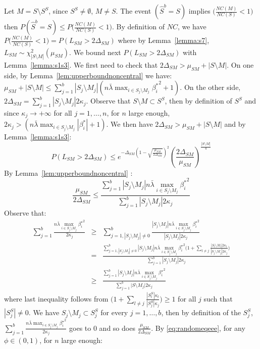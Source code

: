 \documentclass[aos]{imsart}
\theoremstyle{plain}
\begin{document}
\begin{supplement}
Let $M=S\setminus S^S$, since $S^S\neq \emptyset$, $M\neq S$. The event $(\hat{S}^b=S)$ implies $\big(\frac{NC(M)}{NC(S)}<1\big)$ then $P(\hat{S}^b=S)\leq P\big(\frac{NC(M)}{NC(S)}<1\big)$. By definition of $NC$, we have
$P\big(\frac{NC(M)}{NC(S)}<1\big) = P(L_{SM}> 2\Delta_{SM})$ where by Lemma~\ref{lemma:s7},  $L_{SM}\sim \chi_{|S\setminus M|}^2(\mu_{SM})$. We  bound next $P(L_{SM}> 2\Delta_{SM})$ with Lemma~\ref{lemma:s1s3}. We first need to check that $2\Delta_{SM} > \mu_{SM} + |S\setminus M|$.
On one side, by Lemma~\ref{lem:upperboundnoncentral} we have:
$\mu_{SM} + |S\setminus M| \leq  \sum_{j=1}^b |S_j\setminus M_j|(n\bar{\lambda}\max_{i\in S_j\setminus M_j}{\beta_i^*}^2+1)$. On the other side, $2\Delta_{SM}=\sum_{j=1}^b |S_j\setminus M_j|2 \kappa_j$. Observe that $S\setminus M \subset S^S$, then by definition of $S^S$ and since $\kappa_j \to +\infty$ for all $j=1,\ldots,n$, for $n$ large enough, $2 \kappa_j >(n\bar{\lambda}\max_{i\in S_j\setminus M_j}|\beta_i^*|+1)$. We then have $2\Delta_{SM} > \mu_{SM} + |S\setminus M|$ and by Lemma~\ref{lemma:s1s3}:
\begin{equation}\label{eq:randomeqeee}
    P(L_{SM}> 2\Delta_{SM}) \leq e^{-\Delta_{SM}\left(1-\sqrt{\frac{\mu_{SM}}{2\Delta_{SM}}}\right)^2}\left(\frac{2\Delta_{SM}}{\mu_{SM}}\right)^{\frac{|S\setminus M|}{4}}
\end{equation}
By Lemma~\ref{lem:upperboundnoncentral} :
$$\frac{\mu_{SM}}{2\Delta_{SM}}\leq \frac{ \sum_{j=1}^b |S_j\setminus M_j|n\bar{\lambda}\max_{i\in S_j\setminus M_j}{\beta_i^*}^2}{\sum_{j=1}^b |S_j\setminus M_j|2 \kappa_j}$$
Observe that:
\begin{eqnarray*}
    \sum_{j=1}^b\frac{n\bar{\lambda}\max_{i\in S_j\setminus M_j}{\beta_i^{\star}}^2}{2\kappa_j}
    &\geq &\sum_{j=1,|S_j\setminus M_j|\neq 0}^b\frac{|S_j\setminus M_j|n\bar{\lambda}\max_{i\in S_j\setminus M_j}{\beta_i^{\star}}^2}{|S_j\setminus M_j|2\kappa_j} \\
    &=& \frac{\sum_{j=1,|S_j\setminus M_j|\neq 0 }^b|S_j\setminus M_j|n\bar{\lambda}\max_{i\in S_j\setminus M_j}{\beta_i^{\star}}^2\Big(1+\sum_{l\neq j}\frac{|S_l\setminus M_l|2\kappa_l}{|S_j\setminus M_j|2\kappa_j}\Big)}{\sum_{j=1}^b|S_j\setminus M_j|2\kappa_j} \\
    &\geq & \frac{\sum_{j=1}^b|S_j\setminus M_j|n\bar{\lambda}\max_{i\in S_j\setminus M_j}{\beta_i^{\star}}^2}{\sum_{j=1}^b \big|S\setminus M_j\big|2\kappa_j} 
\end{eqnarray*}
where last inequality follows from $\Big(1+\sum_{l\neq j}\frac{|S_l^S|\kappa_l}{|S_j^S|\kappa_j}\Big)\geq 1$ for all $j$ such that $|S_j^S|\neq 0$. We have $S_j\setminus M_j \subset S_j^S$ for every $j=1,\ldots,b$, then by definition of the $S_j^S$, $\sum_{j=1}^b\frac{n\bar{\lambda}\max_{i\in S_j\setminus M_j}{\beta_i^{\star}}^2}{2\kappa_j}$ goes to 0 and so does $\frac{\mu_{SM}}{2\Delta_{SM}}$. By \eqref{eq:randomeqeee}, for any $\phi \in (0,1)$, for $n$ large enough:

\end{supplement}
\end{document}
